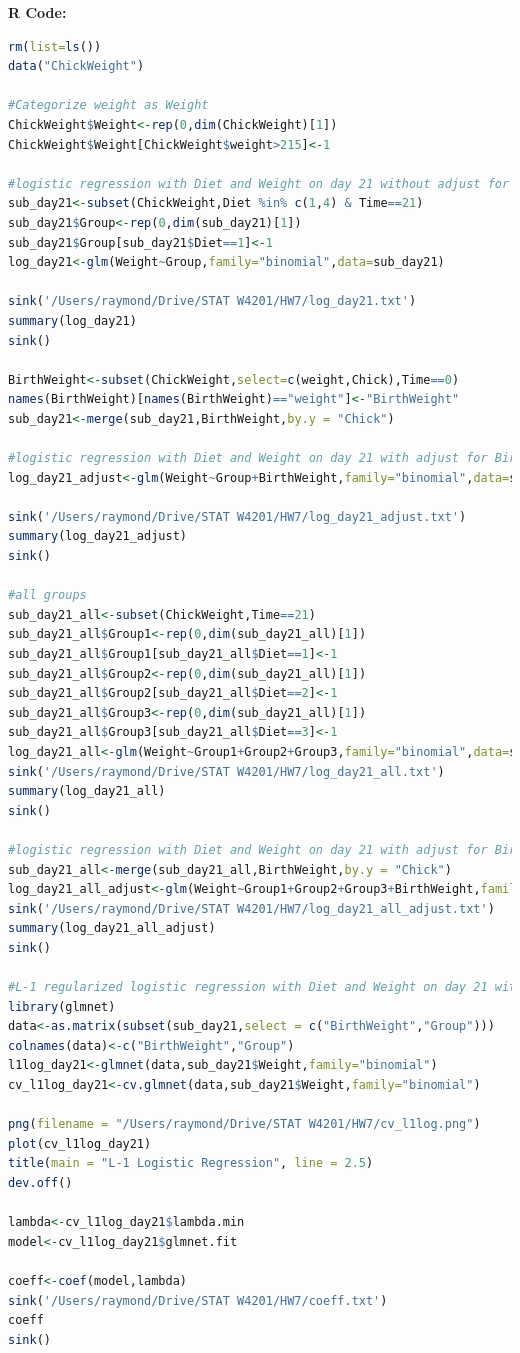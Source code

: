 \documentclass[10pt,letterpaper]{article}
\begin{document}
\newpage
\textbf{R Code:}
\begin{lstlisting}[language=R]
rm(list=ls())
data("ChickWeight")

#Categorize weight as Weight
ChickWeight$Weight<-rep(0,dim(ChickWeight)[1])
ChickWeight$Weight[ChickWeight$weight>215]<-1

#logistic regression with Diet and Weight on day 21 without adjust for Birth Weight
sub_day21<-subset(ChickWeight,Diet %in% c(1,4) & Time==21)
sub_day21$Group<-rep(0,dim(sub_day21)[1])
sub_day21$Group[sub_day21$Diet==1]<-1
log_day21<-glm(Weight~Group,family="binomial",data=sub_day21)

sink('/Users/raymond/Drive/STAT W4201/HW7/log_day21.txt')
summary(log_day21)
sink()

BirthWeight<-subset(ChickWeight,select=c(weight,Chick),Time==0)
names(BirthWeight)[names(BirthWeight)=="weight"]<-"BirthWeight"
sub_day21<-merge(sub_day21,BirthWeight,by.y = "Chick")

#logistic regression with Diet and Weight on day 21 with adjust for Birth Weight
log_day21_adjust<-glm(Weight~Group+BirthWeight,family="binomial",data=sub_day21)

sink('/Users/raymond/Drive/STAT W4201/HW7/log_day21_adjust.txt')
summary(log_day21_adjust)
sink()

#all groups 
sub_day21_all<-subset(ChickWeight,Time==21)
sub_day21_all$Group1<-rep(0,dim(sub_day21_all)[1])
sub_day21_all$Group1[sub_day21_all$Diet==1]<-1
sub_day21_all$Group2<-rep(0,dim(sub_day21_all)[1])
sub_day21_all$Group2[sub_day21_all$Diet==2]<-1
sub_day21_all$Group3<-rep(0,dim(sub_day21_all)[1])
sub_day21_all$Group3[sub_day21_all$Diet==3]<-1
log_day21_all<-glm(Weight~Group1+Group2+Group3,family="binomial",data=sub_day21_all)
sink('/Users/raymond/Drive/STAT W4201/HW7/log_day21_all.txt')
summary(log_day21_all)
sink()

#logistic regression with Diet and Weight on day 21 with adjust for Birth Weight
sub_day21_all<-merge(sub_day21_all,BirthWeight,by.y = "Chick")
log_day21_all_adjust<-glm(Weight~Group1+Group2+Group3+BirthWeight,family="binomial",data=sub_day21_all)
sink('/Users/raymond/Drive/STAT W4201/HW7/log_day21_all_adjust.txt')
summary(log_day21_all_adjust)
sink()

#L-1 regularized logistic regression with Diet and Weight on day 21 with adjust for Birth Weight
library(glmnet)
data<-as.matrix(subset(sub_day21,select = c("BirthWeight","Group")))
colnames(data)<-c("BirthWeight","Group")
l1log_day21<-glmnet(data,sub_day21$Weight,family="binomial")
cv_l1log_day21<-cv.glmnet(data,sub_day21$Weight,family="binomial")

png(filename = "/Users/raymond/Drive/STAT W4201/HW7/cv_l1log.png")
plot(cv_l1log_day21)
title(main = "L-1 Logistic Regression", line = 2.5)
dev.off()

lambda<-cv_l1log_day21$lambda.min
model<-cv_l1log_day21$glmnet.fit

coeff<-coef(model,lambda)
sink('/Users/raymond/Drive/STAT W4201/HW7/coeff.txt')
coeff
sink()
\end{lstlisting}
\end{document}
